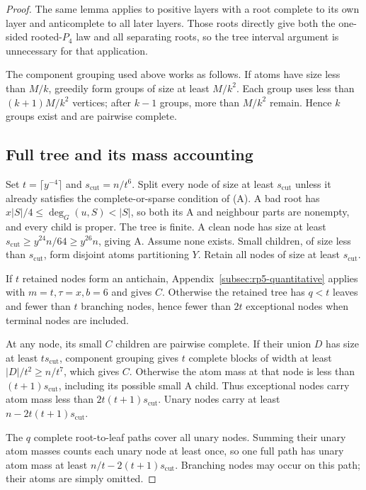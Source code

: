 \documentclass[11pt,a4paper]{article}
\theoremstyle{definition}
\theoremstyle{remark}
\numberwithin{equation}{section}
\begin{document}
\begin{proof}
The same lemma applies to positive layers with a root complete to its own layer and anticomplete to all later layers. Those roots directly give both the one-sided rooted-\(P_{4}\) law and all separating roots, so the tree interval argument is unnecessary for that application.

The component grouping used above works as follows. If atoms have size less than \(M/k\), greedily form groups of size at least \(M/k^{2}\). Each group uses less than \((k+1)M/k^{2}\) vertices; after \(k-1\) groups, more than \(M/k^{2}\) remain. Hence \(k\) groups exist and are pairwise complete.
\subsection{Full tree and its mass accounting}\label{subsec:rp5-tree}
Set \(t=\lceil y^{-4}\rceil\) and \(s_{\mathrm{cut}}=n/t^{6}\). Split every node of size at least \(s_{\mathrm{cut}}\) unless it already satisfies the complete-or-sparse condition of (A). A bad root has \(x|S|/4\le\allowbreak \deg _{G}(u,\allowbreak S)<|S|\), so both its A and neighbour parts are nonempty, and every child is proper. The tree is finite. A clean node has size at least \(s_{\mathrm{cut}}\ge\allowbreak y^{24} n/64\ge\allowbreak y^{26} n\), giving A. Assume none exists. Small children, of size less than \(s_{\mathrm{cut}}\), form disjoint atoms partitioning \(Y\). Retain all nodes of size at least \(s_{\mathrm{cut}}\).

If \(t\) retained nodes form an antichain, Appendix~\ref{subsec:rp5-quantitative} applies with \(m=t,\allowbreak  \tau=x,\allowbreak b=6\) and gives \(C\). Otherwise the retained tree has \(q<t\) leaves and fewer than \(t\) branching nodes, hence fewer than \(2t\) exceptional nodes when terminal nodes are included.

At any node, its small \(C\) children are pairwise complete. If their union \(D\) has size at least \(ts_{\mathrm{cut}}\), component grouping gives \(t\) complete blocks of width at least \(|D|/t^{2}\ge\allowbreak n/t^{7}\), which gives \(C\). Otherwise the atom mass at that node is less than \((t+1)s_{\mathrm{cut}}\), including its possible small A child. Thus exceptional nodes carry atom mass less than \(2t(t+1)s_{\mathrm{cut}}\). Unary nodes carry at least \(n-2t(t+1)s_{\mathrm{cut}}\).

The \(q\) complete root-to-leaf paths cover all unary nodes. Summing their unary atom masses counts each unary node at least once, so one full path has unary atom mass at least \(n/t-2(t+1)s_{\mathrm{cut}}\). Branching nodes may occur on this path; their atoms are simply omitted.


\end{proof}
\end{document}
